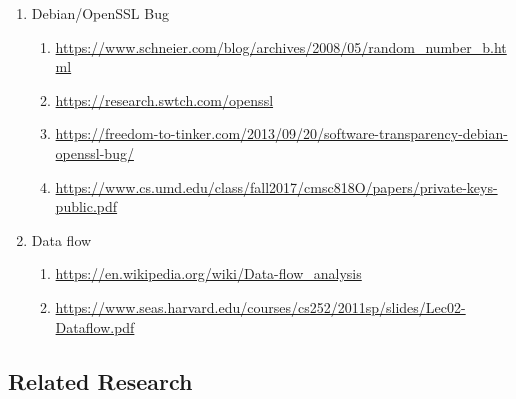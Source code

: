 \documentclass[letterpaper,twocolumn,10pt]{article}
\begin{document}
\begin{enumerate}
	\item Debian/OpenSSL Bug 
		\begin{enumerate}
			\item \url{https://www.schneier.com/blog/archives/2008/05/random_number_b.html}
			\item \url{https://research.swtch.com/openssl}
			\item \url{https://freedom-to-tinker.com/2013/09/20/software-transparency-debian-openssl-bug/}
			\item \url{https://www.cs.umd.edu/class/fall2017/cmsc818O/papers/private-keys-public.pdf}
		\end{enumerate}
	\item Data flow
		\begin{enumerate}
			\item \url{https://en.wikipedia.org/wiki/Data-flow_analysis}
			\item \url{https://www.seas.harvard.edu/courses/cs252/2011sp/slides/Lec02-Dataflow.pdf}
		\end{enumerate}

\end{enumerate}

\subsection{Related Research}

\end{document}
